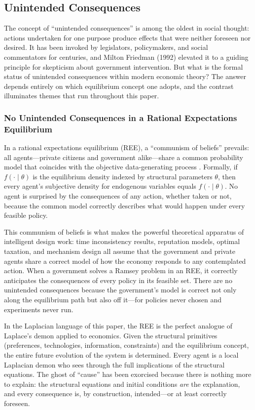 \documentclass[12pt]{article}
\begin{document}
\subsection{Unintended Consequences}

The concept of ``unintended consequences'' is among the oldest in social thought: actions undertaken for one purpose produce effects that were neither foreseen nor desired. It has been invoked by legislators, policymakers, and social commentators for centuries, and Milton Friedman (1992) elevated it to a guiding principle for skepticism about government intervention. But what is the formal status of unintended consequences within modern economic theory? The answer depends entirely on which equilibrium concept one adopts, and the contrast illuminates themes that run throughout this paper.

\subsubsection{No Unintended Consequences in a Rational Expectations Equilibrium}

In a rational expectations equilibrium (REE), a ``communism of beliefs'' prevails: all agents---private citizens and government alike---share a common probability model that coincides with the objective data-generating process \cite{Sargent2008}. Formally, if $f(\cdot \mid \theta)$ is the equilibrium density indexed by structural parameters $\theta$, then every agent's subjective density for endogenous variables equals $f(\cdot \mid \theta)$. No agent is surprised by the consequences of any action, whether taken or not, because the common model correctly describes what would happen under every feasible policy.

This communism of beliefs is what makes the powerful theoretical apparatus of intelligent design work: time inconsistency results, reputation models, optimal taxation, and mechanism design all assume that the government and private agents share a correct model of how the economy responds to any contemplated action. When a government solves a Ramsey problem in an REE, it correctly anticipates the consequences of every policy in its feasible set. There are no unintended consequences because the government's model is correct not only along the equilibrium path but also off it---for policies never chosen and experiments never run.

In the Laplacian language of this paper, the REE is the perfect analogue of Laplace's demon applied to economics. Given the structural primitives (preferences, technologies, information, constraints) and the equilibrium concept, the entire future evolution of the system is determined. Every agent is a local Laplacian demon who sees through the full implications of the structural equations. The ghost of ``cause'' has been exorcised because there is nothing more to explain: the structural equations and initial conditions \emph{are} the explanation, and every consequence is, by construction, intended---or at least correctly foreseen.
\end{document}

